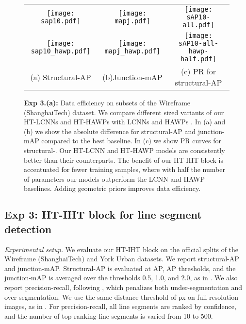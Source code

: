 \documentclass[runningheads]{llncs}
\newcommand{\model}{HT-IHT block\xspace}
\begin{document}
\begin{figure}[t!]
    \centering
    \begin{tabular}{ccc}
        \texttt{[image: sap10.pdf]} &
        \texttt{[image: mapj.pdf]} &
        \texttt{[image: sAP10-all.pdf]} \\
        
        \texttt{[image: sap10\_hawp.pdf]} &
        \texttt{[image: mapj\_hawp.pdf]} &
        \texttt{[image: sAP10-all-hawp-half.pdf]} \\
        (a) Structural-AP & (b)Junction-mAP & (c) PR for structural-AP\\
    \end{tabular}
    \caption{\textbf{Exp 3.(a):} Data efficiency on subsets of the Wireframe (ShanghaiTech) dataset.
    We compare different sized variants of our HT-LCNNs and HT-HAWPs with LCNNs \cite{zhou2019end} and HAWPs \cite{xue2020holistically}. 
    In (a) and (b) we show the absolute difference for structural-AP and junction-mAP compared to the best baseline. 
    In (c) we show PR curves for structural-.
    Our HT-LCNN and HT-HAWP models are consistently better than their counterparts. 
    The benefit of our \model is accentuated for fewer training samples, where with half the number of parameters our models outperform the LCNN and HAWP baselines.
    Adding geometric priors improves data efficiency.}
    \label{fig:exp3_a}
\end{figure}


\subsection{\textbf{Exp 3:} \model for line segment detection}
\noindent\emph{Experimental setup.} 
We evaluate our \model on the official splits of the Wireframe (ShanghaiTech) \cite{huang2018learning} and York Urban \cite{denis2008efficient} datasets. 
We report structural-AP and junction-mAP. 
Structural-AP is evaluated at AP, AP thresholds, and the junction-mAP is averaged over the thresholds 0.5, 1.0, and 2.0, as in \cite{zhou2019learning}.
We also report precision-recall, following \cite{almazan2017mcmlsd}, which penalizes both under-segmentation and over-segmentation. 
We use the same distance threshold of  px on full-resolution images, as in \cite{almazan2017mcmlsd}. 
For precision-recall, all line segments are ranked by confidence, and the number of top ranking line segments is varied from 10 to 500. 
\end{document}
